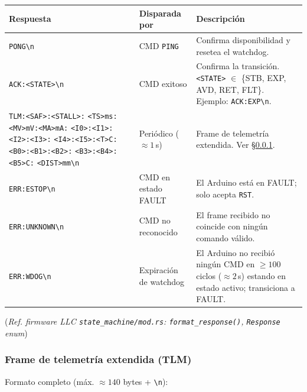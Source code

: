 \begin{center}
\small
\renewcommand{\arraystretch}{1.3}
\begin{tabular}{p{4.5cm}p{3.0cm}p{5.4cm}}
\toprule
\textbf{Respuesta} & \textbf{Disparada por} & \textbf{Descripción} \\
\midrule
\verb|PONG\n| &
  CMD \verb|PING| &
  Confirma disponibilidad y resetea el watchdog. \\

\verb|ACK:<STATE>\n| &
  CMD exitoso &
  Confirma la transición. \verb|<STATE>| $\in$ \{STB, EXP, AVD, RET, FLT\}.
  Ejemplo: \verb|ACK:EXP\n|. \\

\verb|TLM:<SAF>:<STALL>:| \newline
\verb|<TS>ms:<MV>mV:<MA>mA:| \newline
\verb|<I0>:<I1>:<I2>:<I3>:| \newline
\verb|<I4>:<I5>:<T>C:| \newline
\verb|<B0>:<B1>:<B2>:| \newline
\verb|<B3>:<B4>:<B5>C:| \newline
\verb|<DIST>mm\n| &
  Periódico ($\approx 1$\,s) &
  Frame de telemetría extendida. Ver §\ref{ssec:icd_llc_tlm}. \\

\verb|ERR:ESTOP\n| &
  CMD en estado FAULT &
  El Arduino está en FAULT; solo acepta \verb|RST|. \\

\verb|ERR:UNKNOWN\n| &
  CMD no reconocido &
  El frame recibido no coincide con ningún comando válido. \\

\verb|ERR:WDOG\n| &
  Expiración de watchdog &
  El Arduino no recibió ningún CMD en $\geq 100$ ciclos
  ($\approx 2$\,s) estando en estado activo; transiciona a FAULT. \\
\bottomrule
\end{tabular}
\end{center}
(\emph{Ref. firmware LLC \texttt{state\_machine/mod.rs}: \texttt{format\_response()}, \texttt{Response} enum})

\subsubsection{Frame de telemetría extendida (TLM)}
\label{ssec:icd_llc_tlm}

Formato completo (máx. $\approx 140$ bytes + \verb|\n|):

